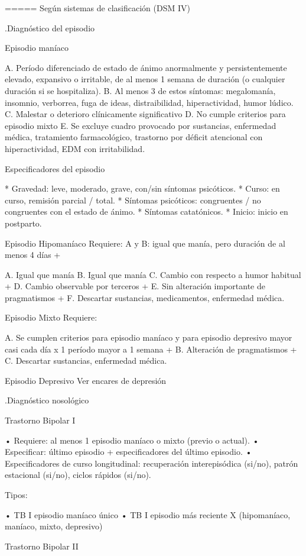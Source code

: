 ===== Según sistemas de clasificación (DSM IV)

.Diagnóstico del episodio

Episodio maníaco

A. Período diferenciado de estado de ánimo anormalmente y persistentemente elevado, expansivo o irritable, de al menos 1 semana de duración (o cualquier duración si se hospitaliza).
B. Al menos 3 de estos síntomas: megalomanía, insomnio, verborrea, fuga de ideas, distraibilidad, hiperactividad, humor lúdico.
C. Malestar o deterioro clínicamente significativo
D. No cumple criterios para episodio mixto
E. Se excluye cuadro provocado por sustancias, enfermedad médica, tratamiento farmacológico, trastorno por déficit atencional con hiperactividad, EDM con irritabilidad.

Especificadores del episodio

* Gravedad: leve, moderado, grave, con/sin síntomas psicóticos.
* Curso: en curso, remisión parcial / total.
* Síntomas psicóticos: congruentes / no congruentes con el estado de ánimo.
* Síntomas catatónicos.
* Inicio: inicio en postparto.

Episodio Hipomaníaco Requiere: A y B: igual que manía, pero duración de al menos 4 días +

A. Igual que manía
B. Igual que manía
C. Cambio con respecto a humor habitual +
D. Cambio observable por terceros +
E. Sin alteración importante de pragmatismos +
F. Descartar sustancias, medicamentos, enfermedad médica.

Episodio Mixto Requiere:

A. Se cumplen criterios para episodio maníaco y para episodio depresivo mayor casi cada día x 1 período mayor a 1 semana +
B. Alteración de pragmatismos +
C. Descartar sustancias, enfermedad médica.

Episodio Depresivo Ver encares de depresión

.Diagnóstico nosológico

Trastorno Bipolar I

• Requiere: al menos 1 episodio maníaco o mixto (previo o actual).
• Especificar: último episodio + especificadores del último episodio.
• Especificadores de curso longitudinal: recuperación interepisódica (si/no), patrón estacional (si/no), ciclos rápidos (si/no).

Tipos:

• TB I episodio maníaco único
• TB I episodio más reciente X (hipomaníaco, maníaco, mixto, depresivo)

Trastorno Bipolar II

